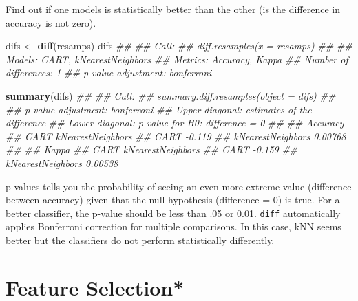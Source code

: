 \documentclass[
  notitlepage]{book}
\newenvironment{Shaded}{\begin{snugshade}}{\end{snugshade}}
\newcommand{\CommentTok}[1]{\textcolor[rgb]{0.56,0.35,0.01}{\textit{#1}}}
\newcommand{\KeywordTok}[1]{\textcolor[rgb]{0.13,0.29,0.53}{\textbf{#1}}}
\newcommand{\NormalTok}[1]{#1}
\newcommand{\StringTok}[1]{\textcolor[rgb]{0.31,0.60,0.02}{#1}}
\begin{document}
Find out if one models is statistically better than the other (is the
difference in accuracy is not zero).

\begin{Shaded}
\begin{Highlighting}[]
\NormalTok{difs \textless{}{-}}\StringTok{ }\KeywordTok{diff}\NormalTok{(resamps)}
\NormalTok{difs}
\CommentTok{\#\# }
\CommentTok{\#\# Call:}
\CommentTok{\#\# diff.resamples(x = resamps)}
\CommentTok{\#\# }
\CommentTok{\#\# Models: CART, kNearestNeighbors }
\CommentTok{\#\# Metrics: Accuracy, Kappa }
\CommentTok{\#\# Number of differences: 1 }
\CommentTok{\#\# p{-}value adjustment: bonferroni}
\end{Highlighting}
\end{Shaded}

\begin{Shaded}
\begin{Highlighting}[]
\KeywordTok{summary}\NormalTok{(difs)}
\CommentTok{\#\# }
\CommentTok{\#\# Call:}
\CommentTok{\#\# summary.diff.resamples(object = difs)}
\CommentTok{\#\# }
\CommentTok{\#\# p{-}value adjustment: bonferroni }
\CommentTok{\#\# Upper diagonal: estimates of the difference}
\CommentTok{\#\# Lower diagonal: p{-}value for H0: difference = 0}
\CommentTok{\#\# }
\CommentTok{\#\# Accuracy }
\CommentTok{\#\#                   CART    kNearestNeighbors}
\CommentTok{\#\# CART                      {-}0.119           }
\CommentTok{\#\# kNearestNeighbors 0.00768                  }
\CommentTok{\#\# }
\CommentTok{\#\# Kappa }
\CommentTok{\#\#                   CART    kNearestNeighbors}
\CommentTok{\#\# CART                      {-}0.159           }
\CommentTok{\#\# kNearestNeighbors 0.00538}
\end{Highlighting}
\end{Shaded}

p-values tells you the probability of seeing an even more extreme value
(difference between accuracy) given that the null hypothesis (difference
= 0) is true. For a better classifier, the p-value should be less than
.05 or 0.01. \texttt{diff} automatically applies Bonferroni correction for
multiple comparisons. In this case, kNN seems better but the classifiers
do not perform statistically differently.

\hypertarget{feature-selection}{%
\section{Feature Selection*}\label{feature-selection}}
\end{document}
